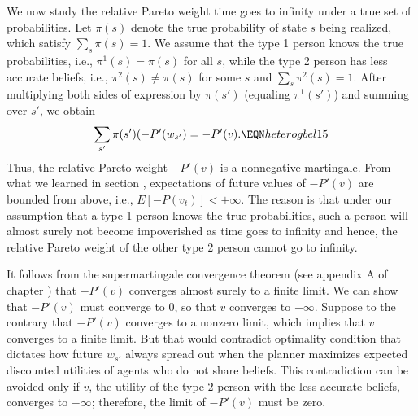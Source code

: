 We now study the  relative
Pareto weight  time goes to
infinity under a true set of probabilities.
Let $\pi(s)$ denote the true probability of 
state $s$ being realized, which satisfy
$\sum_{s} \pi(s) =1$. We assume that 
the type 1 person knows the true probabilities, 
i.e., $\pi^1(s)=\pi(s)$ for all $s$, while
the type 2 person has less accurate beliefs, i.e.,
$\pi^2(s) \neq \pi(s)$ for some $s$ and
$\sum_{s} \pi^2(s) =1$. After multiplying both sides 
of expression  by $\pi(s')$
(equaling $\pi^1(s')$) and summing over $s'$, 
we obtain
$$
\sum_{s'} \pi(s') (-P'(w_{s'}) = -P'(v) .    
                             \EQN heterogbel15 $$
Thus, the relative Pareto weight $-P'(v)$ is 
a nonnegative martingale. From what we 
learned in section ,
expectations of future values of $-P'(v)$ are
bounded from above, i.e., $E[-P(v_t)]<+\infty$.
The reason is that under our assumption that
a type 1 person knows the true probabilities,
such a person will almost surely not become
impoverished  as
time goes to infinity and 
hence, the relative Pareto weight of the other 
type 2 person cannot go to infinity.

It follows from the supermartingale convergence
theorem (see appendix A of chapter ) 
that $-P'(v)$ converges almost surely to a finite
limit. We can show that $-P'(v)$ must converge 
to $0$, so that $v$ converges to $-\infty$. 
Suppose to the contrary that $-P'(v)$ converges 
to a nonzero limit, which implies that $v$ 
converges to a finite limit. But that would
contradict optimality condition 
that dictates how future $w_{s'}$ always 
spread out when the planner maximizes 
expected discounted utilities of agents who
do not share beliefs. This 
contradiction can be avoided only if $v$, the
utility of the type 2 person with the less
accurate beliefs, converges to $-\infty$; 
therefore, the limit of
$-P'(v)$ must be zero.













